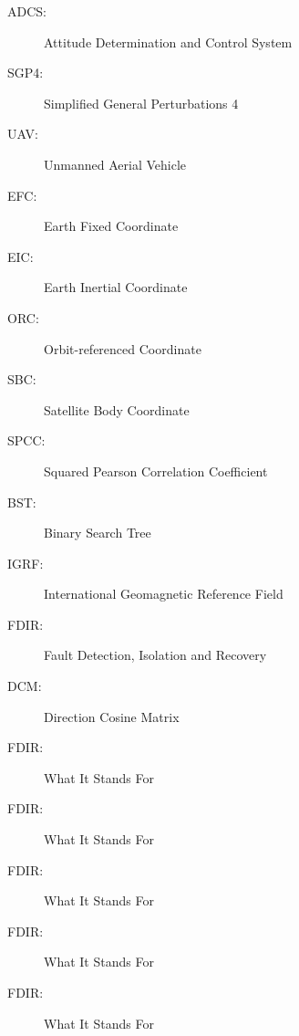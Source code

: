 

\ifoddmakenewpage




%
%


\listofacronyms %


\begin{description}
\item[ADCS:] Attitude Determination and Control System
\item[SGP4:] Simplified General Perturbations 4
\item[UAV:] Unmanned Aerial Vehicle
\item[EFC:] Earth Fixed Coordinate
\item[EIC:] Earth Inertial Coordinate
\item[ORC:] Orbit-referenced Coordinate 
\item[SBC:] Satellite Body Coordinate
\item[SPCC:] Squared Pearson Correlation Coefficient
\item[BST:] Binary Search Tree
\item[IGRF:] International Geomagnetic Reference Field
\item[FDIR:] Fault Detection, Isolation and Recovery
\item[DCM:] Direction Cosine Matrix
\item[FDIR:] What It Stands For
\item[FDIR:] What It Stands For
\item[FDIR:] What It Stands For
\item[FDIR:] What It Stands For
\item[FDIR:] What It Stands For

\end{description}





\ifoddmakenewpage




%
%

\listoffigures
\ifoddmakenewpage
\listoftables
\ifoddmakenewpage
\listofalgorithms
\ifoddmakenewpage
